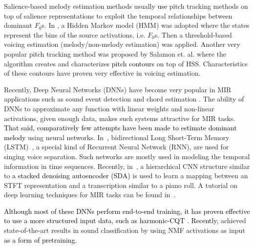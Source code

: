 \documentclass{article}
\newcommand{\gp}[1]{{\textcolor{black}{#1}}}
\newcommand{\jb}[1]{{\textcolor{black}{#1}}}
\newcommand{\jbcor}[2]{{\textcolor{black}{#2}}}
\begin{document}
Salience-based melody estimation methods usually \gp{use} pitch tracking methods on top of salience representations to exploit the temporal relationships between dominant $F_0$s. 
In \cite{Durrieu}, a Hidden Markov model (HMM) was adopted where the states represent the bins of the source activations, i.e. $F_0$s. 
Then a threshold-based voicing estimation (melody/non-melody estimation) was applied. Another very popular pitch tracking method was proposed by Salamon et. al. \cite{melodia} where the algorithm creates and characterizes \jbcor{pitch-contours}{pitch contours} on top of HSS. 
Characteristics of these contours have proven very effective in voicing estimation\cite{melodia,bittner2016_comparison}.

Recently, Deep Neural Networks (DNNs) have become very popular in MIR applications such as sound event detection \cite{eventdetection-CRNN,eventdetection-Bisot} and chord estimation \cite{mcfee_chord}.
The ability of DNNs to approximate any function with linear weights and non-linear activations, given enough data, makes such systems attractive for MIR tasks. 
\jb{That said, comparatively few attempts have been made}
\jb{to estimate dominant melody}
using neural networks.
In~\cite{BLSTM_singingvoice,simon_BLSTM_singingvoice}, bidirectional Long Short-Term Memory (LSTM)~\cite{LSTM}, a special kind of Recurrent Neural Network (RNN), are used for singing voice separation. 
Such networks are mostly used in modeling the temporal information in time sequences. 
Recently, in~\cite{jazzCNN}, a hierarchical CNN structure similar to \jbcor{stacked denoising autoencoders (SDAs)}{a stacked denoising autoencoder (SDA)} \cite{stackedAutoEncoders} is used to learn a mapping between an STFT representation and a transcription similar to a piano roll.
A tutorial on deep learning techniques for MIR tasks can be found in~\cite{MIR-deeplearningtutorial}.

\jb{Although most of these DNNs perform end-to-end training, it has proven effective to use a more structured input data, such as harmonic-CQT \cite{bittner2017_deep}. Recently,}
\cite{eventdetection-Bisot} achieved state-of-the-art results in sound classification by using NMF activations as input
\jb{as a form of pretraining.}
\end{document}
